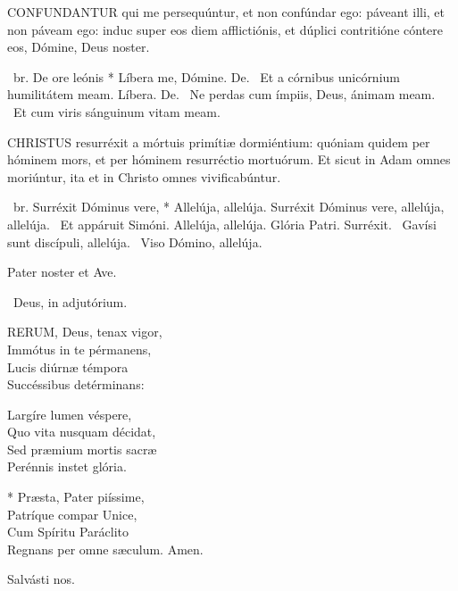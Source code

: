
\lettrine[lines=2]{C}{ONFUNDANTUR} qui me persequúntur, et non confúndar ego: páveant illi, et non páveam ego: induc super eos diem afflictiónis, et dúplici contritióne cóntere eos, Dómine, Deus noster.

\R\ br. De ore leónis * Líbera me, Dómine. De. \V\ Et a córnibus unicórnium humilitátem meam. Líbera. De. \V\ Ne perdas cum ímpiis, Deus, ánimam meam. \R\ Et cum viris sánguinum vitam meam.




\lettrine[lines=2]{C}{HRISTUS} resurréxit a mórtuis primítiæ dormiéntium: quóniam quidem per hóminem mors, et per hóminem resurréctio mortuórum. Et sicut in Adam omnes moriúntur, ita et in Christo omnes vivificabúntur.

\R\ br. Surréxit Dóminus vere, * Allelúja, allelúja. Surréxit Dóminus vere, allelúja, allelúja. \V\ Et appáruit Simóni. Allelúja, allelúja. Glória Patri. Surréxit. \V\ Gavísi sunt discípuli, allelúja. \R\ Viso Dómino, allelúja.


\sectionornament


Pater noster et Ave.

\V\ Deus, in adjutórium.


\lettrine[lines=2]{R}{ERUM}, Deus, tenax vigor,\\
Immótus in te pérmanens,\\
Lucis diúrnæ témpora\\
Succéssibus detérminans:

Largíre lumen véspere,\\
Quo vita nusquam décidat,\\
Sed præmium mortis sacræ\\
Perénnis instet glória.

* Præsta, Pater piíssime,\\
Patríque compar Unice,\\
Cum Spíritu Paráclito\\
Regnans per omne sæculum. Amen.

  Salvásti nos.

